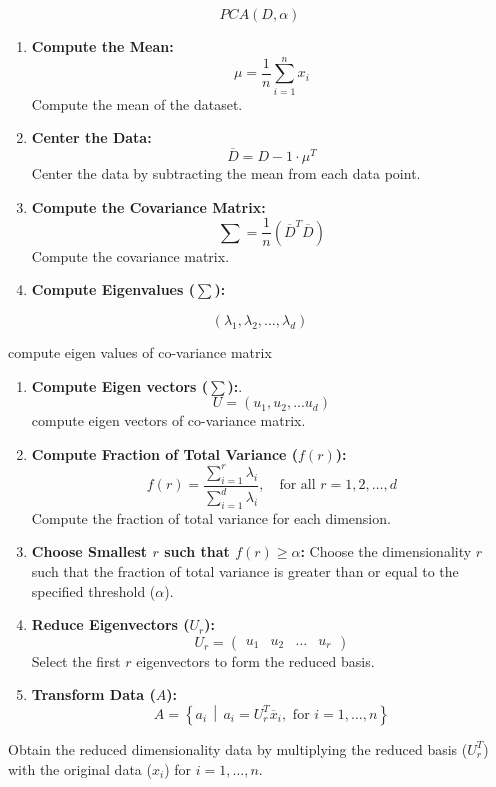 \documentclass[a4paper,conference]{IEEEtran}
\begin{document}
\[PCA(D, \alpha)\]

\begin{enumerate}
\def\labelenumi{\arabic{enumi}.}
\item
  \textbf{Compute the Mean:} \[
  \mu = \frac{1}{n} \sum_{i=1}^{n} x_i
  \] Compute the mean of the dataset.
\item
  \textbf{Center the Data:} \[
  \overline{D} = D - 1 \cdot \mu^T
  \] Center the data by subtracting the mean from each data point.
\item
  \textbf{Compute the Covariance Matrix:} \[
  \sum = \frac{1}{n} (\overline{D}^T \overline{D})
  \] Compute the covariance matrix.
\item
  \textbf{Compute Eigenvalues (\(\sum\)):}
\end{enumerate}

\[
(\lambda_1, \lambda_2, \ldots, \lambda_d)
\]

compute eigen values of co-variance matrix

\begin{enumerate}
\def\labelenumi{\arabic{enumi}.}
\setcounter{enumi}{4}
\item
  \textbf{Compute Eigen vectors (\(\sum\)):}. \[
  U = (u_1, u_2,... u_d)
  \] compute eigen vectors of co-variance matrix.
\item
  \textbf{Compute Fraction of Total Variance (\(f(r)\)):} \[
  f(r) = \frac{\sum_{i=1}^{r} \lambda_i}{\sum_{i=1}^{d} \lambda_i}, \quad \text{for all } r = 1, 2, \ldots, d
  \] Compute the fraction of total variance for each dimension.
\item
  \textbf{Choose Smallest \(r\) such that \(f(r) \geq \alpha\):} Choose
  the dimensionality \(r\) such that the fraction of total variance is
  greater than or equal to the specified threshold (\(\alpha\)).
\item
  \textbf{Reduce Eigenvectors (\(U_r\)):} \[
  U_r = \begin{pmatrix} u_1 & u_2 & \ldots & u_r \end{pmatrix}
  \] Select the first \(r\) eigenvectors to form the reduced basis.
\item
  \textbf{Transform Data (\(A\)):} \[
  A = \left\{ a_i \, \middle| \, a_i = U_r^T \overline{x}_i, \text{ for } i = 1, \ldots, n \right\}
  \]
\end{enumerate}

Obtain the reduced dimensionality data by multiplying the reduced basis
(\(U_r^T\)) with the original data (\(x_i\)) for \(i = 1, \ldots, n\).
\end{document}
